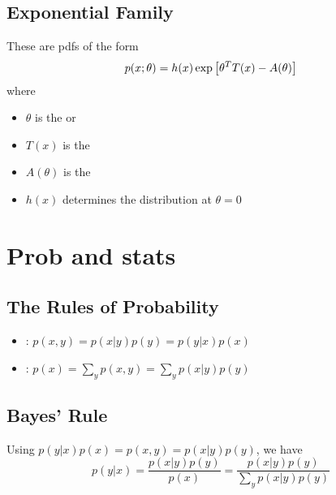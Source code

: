 \documentclass[11pt]{article}
\begin{document}
\subsection{Exponential Family}
These are pdfs of the form
\begin{equation}
  p(x;\theta) = h(x) \exp \left[ \theta^T T(x) - A(\theta) \right]
\end{equation}
where
\begin{itemize}
  \item $\theta$ is the  or 
  \item $T(x)$ is the 
  \item $A(\theta)$ is the 
  \item $h(x)$ determines the distribution at $\theta = 0$
\end{itemize}


\section{Prob and stats}
\subsection{The Rules of Probability}
\begin{itemize}
  \item {}: $p(x, y) = p(x|y) p(y) = p(y|x) p(x)$
  \item {}: $p(x) = \sum\limits_y p(x, y) = \sum\limits_y p(x | y) p(y)$
\end{itemize}

\subsection{Bayes' Rule}
Using $p(y|x) p(x) = p(x,y) = p(x|y) p(y)$, we have
\begin{equation}
  p(y|x) = \frac{p(x|y) p(y)}{p(x)} = \frac{p(x|y) p(y)}{\sum\limits_y p(x|y) p(y)}
\end{equation}
\end{document}
